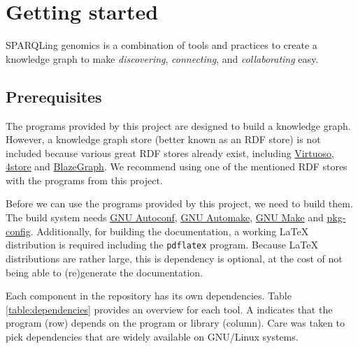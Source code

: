 \chapter{Getting started}

  SPARQLing genomics is a combination of tools and practices to create a
  knowledge graph to make \emph{discovering}, \emph{connecting}, and
  \emph{collaborating} easy.

\section{Prerequisites}
\label{sec:prerequisites}

  The programs provided by this project are designed to build a knowledge graph.
  However, a knowledge graph store (better known as an RDF store) is not included
  because various great RDF stores already exist, including
  \href{https://virtuoso.openlinksw.com/}{Virtuoso},
  \href{https://github.com/4store/4store}{4store} and
  \href{https://www.blazegraph.com/}{BlazeGraph}.  We recommend using one of
  the mentioned RDF stores with the programs from this project.

  Before we can use the programs provided by this project, we need to build
  them.  The build system needs
  \href{https://www.gnu.org/software/autoconf}{GNU Autoconf},
  \href{https://www.gnu.org/software/automake}{GNU Automake},
  \href{https://www.gnu.org/software/make}{GNU Make} and
  \href{https://www.freedesktop.org/wiki/Software/pkg-config/}{pkg-config}.
  Additionally, for building the documentation, a working \LaTeX{} distribution is
  required including the \texttt{pdflatex} program.  Because \LaTeX{} distributions
  are rather large, this is dependency is optional, at the cost of not being able
  to (re)generate the documentation.

  Each component in the repository has its own dependencies.  Table
  \ref{table:dependencies} provides an overview for each tool.  A \B{}
  indicates that the program (row) depends on the program or library (column).
  Care was taken to pick dependencies that are widely available on GNU/Linux
  systems.

